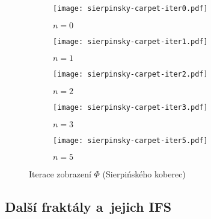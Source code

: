 \begin{figure}[H]
    \centering
    \begin{subfigure}{0.45\textwidth}
        \centering
        \texttt{[image: sierpinsky-carpet-iter0.pdf]}
        \begin{center}
            $n=0$
        \end{center}
    \end{subfigure}
    \qquad
    \vspace{1cm}
    \begin{subfigure}{0.45\textwidth}
        \centering
        \texttt{[image: sierpinsky-carpet-iter1.pdf]}
        \begin{center}
            $n=1$
        \end{center}
    \end{subfigure}
    \qquad
    \begin{subfigure}{0.45\textwidth}
        \centering
        \texttt{[image: sierpinsky-carpet-iter2.pdf]}
        \begin{center}
            $n=2$
        \end{center}
    \end{subfigure}
    \qquad
    \vspace{1cm}
    \begin{subfigure}{0.45\textwidth}
        \centering
        \texttt{[image: sierpinsky-carpet-iter3.pdf]}
        \begin{center}
            $n=3$
        \end{center}
    \end{subfigure}
    \qquad
    \begin{subfigure}{0.45\textwidth}
        \centering
        \texttt{[image: sierpinsky-carpet-iter5.pdf]}
        \begin{center}
            $n=5$
        \end{center}
    \end{subfigure}
    \caption{Iterace zobrazení $\Phi$ (Sierpińského koberec)}
    \label{fig:iterace-zobrazeni-fi-sierpinskeho-koberec}
\end{figure}

\subsection{Další fraktály a~jejich IFS}\label{subsec:fraktaly-a-jejich-ifs}

